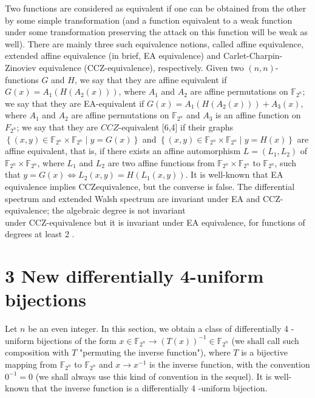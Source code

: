\documentclass[10pt]{article}
\begin{document}
Two functions are considered as equivalent if one can be obtained from the other by some simple transformation (and a function equivalent to a weak function under some transformation preserving the attack on this function will be weak as well). There are mainly three such equivalence notions, called affine equivalence, extended affine equivalence (in brief, EA equivalence) and Carlet-Charpin-Zinoviev equivalence (CCZ-equivalence), respectively. Given two $(n, n)$-functions $G$ and $H$, we say that they are affine equivalent if $G(x)=A_{1}\left(H\left(A_{2}(x)\right)\right)$, where $A_{1}$ and $A_{2}$ are affine permutations on $\mathbb{F}_{2^{n}}$; we say that they are EA-equivalent if $G(x)=A_{1}\left(H\left(A_{2}(x)\right)\right)+A_{3}(x)$, where $A_{1}$ and $A_{2}$ are affine permutations on $\mathbb{F}_{2^{n}}$ and $A_{3}$ is an affine function on $F_{2^{n}}$; we say that they are $C C Z$-equivalent [6,4] if their graphs $\left\{(x, y) \in \mathbb{F}_{2^{n}} \times \mathbb{F}_{2^{n}} \mid y=G(x)\right\}$ and $\left\{(x, y) \in \mathbb{F}_{2^{n}} \times \mathbb{F}_{2^{n}} \mid y=H(x)\right\}$ are affine equivalent, that is, if there exists an affine automorphism $L=\left(L_{1}, L_{2}\right)$ of $\mathbb{F}_{2^{n}} \times \mathbb{F}_{2^{n}}$, where $L_{1}$ and $L_{2}$ are two affine functions from $\mathbb{F}_{2^{n}} \times \mathbb{F}_{2^{n}}$ to $\mathbb{F}_{2^{n}}$, such that $y=G(x) \Leftrightarrow L_{2}(x, y)=H\left(L_{1}(x, y)\right)$. It is well-known that EA equivalence implies CCZequivalence, but the converse is false. The differential spectrum and extended Walsh spectrum are invariant under EA and CCZ-equivalence; the algebraic degree is not invariant\\
under CCZ-equivalence but it is invariant under EA equivalence, for functions of degrees at least 2 .

\section*{3 New differentially 4-uniform bijections}
Let $n$ be an even integer. In this section, we obtain a class of differentially 4 -uniform bijections of the form $x \in \mathbb{F}_{2^{n}} \rightarrow(T(x))^{-1} \in \mathbb{F}_{2^{n}}$ (we shall call such composition with $T$ "permuting the inverse function"), where $T$ is a bijective mapping from $\mathbb{F}_{2^{n}}$ to $\mathbb{F}_{2^{n}}$ and $x \rightarrow x^{-1}$ is the inverse function, with the convention $0^{-1}=0$ (we shall always use this kind of convention in the sequel). It is well-known that the inverse function is a differentially 4 -uniform bijection.
\end{document}
